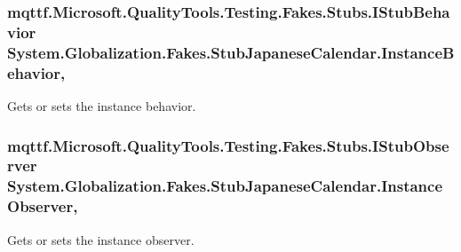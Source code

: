\hypertarget{class_system_1_1_globalization_1_1_fakes_1_1_stub_japanese_calendar_af7b4d34ab2a298b176ca89bbf1faea98}{
\subsubsection[{Instance\-Behavior}]{\setlength{\rightskip}{0pt plus 5cm}mqttf.\-Microsoft.\-Quality\-Tools.\-Testing.\-Fakes.\-Stubs.\-I\-Stub\-Behavior System.\-Globalization.\-Fakes.\-Stub\-Japanese\-Calendar.\-Instance\-Behavior\hspace{0.3cm}{\ttfamily [get]}, {\ttfamily [set]}}}\label{class_system_1_1_globalization_1_1_fakes_1_1_stub_japanese_calendar_af7b4d34ab2a298b176ca89bbf1faea98}


Gets or sets the instance behavior.

\hypertarget{class_system_1_1_globalization_1_1_fakes_1_1_stub_japanese_calendar_a3b927d83e0ba3f1bb11e377d7acedcac}{
\subsubsection[{Instance\-Observer}]{\setlength{\rightskip}{0pt plus 5cm}mqttf.\-Microsoft.\-Quality\-Tools.\-Testing.\-Fakes.\-Stubs.\-I\-Stub\-Observer System.\-Globalization.\-Fakes.\-Stub\-Japanese\-Calendar.\-Instance\-Observer\hspace{0.3cm}{\ttfamily [get]}, {\ttfamily [set]}}}\label{class_system_1_1_globalization_1_1_fakes_1_1_stub_japanese_calendar_a3b927d83e0ba3f1bb11e377d7acedcac}


Gets or sets the instance observer.

